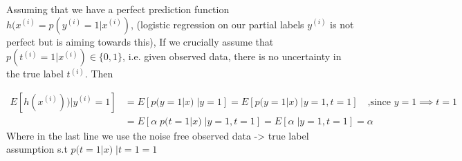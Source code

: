 %
%
\begin{answer}
Assuming that we have a perfect prediction function $h(x^{(i)} = p(y^{(i)} = 1 | x^{(i)})$, (logistic regression on our partial labels $y^{(i)}$ is not perfect but is aiming towards this), If we crucially assume that $p(t^{(i)}=1 | x^{(i)}) \in \{0,1\}$, i.e. given observed data, there is no uncertainty in the true label $t^{(i)}$. Then

\begin{align*}
E[h(x^{(i)})) | y^{(i)} = 1]
	&= E[ p(y=1 | x) \;| y=1] = E[ p(y=1 | x) \;| y=1, t=1] \quad \text{,since $y=1 \implies t=1$}\\	
	&= E[ \alpha\; p(t=1 | x) \;| y=1, t=1] = E[\alpha \;| y=1, t=1] = \alpha 
\end{align*}
Where in the last line we use the noise free observed data -> true label assumption s.t $p(t=1 | x) \;| t=1 = 1$
\end{answer}
%